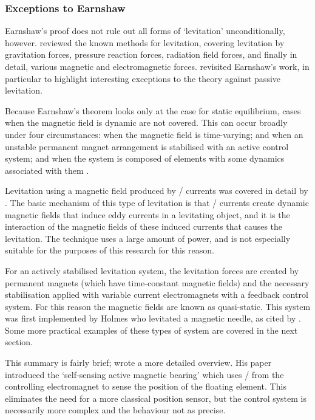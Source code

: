\subsubsection{Exceptions to Earnshaw}

Earnshaw's proof does not rule out all forms of `levitation' unconditionally, however.
\textcite{boerdijk1956a} reviewed the known methods for levitation, covering levitation by gravitation forces, pressure reaction forces, radiation field forces, and finally in detail, various magnetic and electromagnetic forces.
\textcite{bassani2006} revisited Earnshaw's work, in particular to highlight interesting exceptions to the theory against passive levitation.

Because Earnshaw's theorem looks only at the case for static equilibrium, cases when the magnetic field is dynamic are not covered.
This can occur broadly under four circumstances: when the magnetic field is time-varying; and when an unstable permanent magnet arrangement is stabilised with an active control system; and when the system is composed of elements with some dynamics associated with them
.

Levitation using a magnetic field produced by \AC/ currents was covered in detail by \textcite{laithwaite1965}.
The basic mechanism of this type of levitation is that \AC/ currents create dynamic magnetic fields that induce eddy currents in a levitating object, and it is the interaction of the magnetic fields of these induced currents that causes the levitation.
The technique uses a large amount of power, and is not especially suitable for the purposes of this research for this reason.

For an actively stabilised levitation system, the levitation forces are created by permanent magnets (which have time-constant magnetic fields) and the necessary stabilisation applied with variable current electromagnets with a feedback control system.
For this reason the magnetic fields are known as quasi-static.
This system was first implemented by Holmes who levitated a magnetic needle, as cited by \textcite{boerdijk1956a}.
Some more practical examples of these types of system are covered in the next section.

This summary is fairly brief; \textcite{bleuler1992} wrote a more detailed overview.
His paper introduced the `self-sensing active magnetic bearing' \cite{vischer1993} which uses \backemf/ from the controlling electromagnet to sense the position of the floating element.
This eliminates the need for a more classical position sensor,
but the control system is necessarily more complex and the behaviour not as precise.

